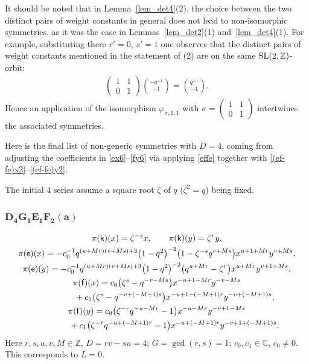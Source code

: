 \documentclass[10pt,a4paper]{amsart}
\numberwithin{equation}{section}
\begin{document}
\begin{Remark}It should be noted that in Lemma~\ref{lem_det4}(2), the choice between the two distinct pairs of weight constants in general does not lead to non-isomorphic symmetries, as it was the case in Lemmas~\ref{lem_det2}(1) and~\ref{lem_det4}(1). For example, substituting there $r'=0$, $s'=1$ one observes that the distinct pairs of weight constants mentioned in the statement of (2) are on the same ${\rm SL}(2,\mathbb{Z})$-orbit:
\begin{gather*}
\begin{pmatrix}1 & 1\\ 0 & 1\end{pmatrix}\binom{-q^{-1}}{-1}=\binom{q^{-1}}{-1}.
\end{gather*}
Hence an application of the isomorphism $\varphi_{\sigma,1,1}$ with $\sigma= \left(\begin{smallmatrix}1 & 1\\ 0 & 1\end{smallmatrix}\right)$ intertwines the associated symmetries.
\end{Remark}

Here is the final list of non-generic symmetries with $D=4$, coming from adjusting the coefficients in \eqref{ex6}--\eqref{fy6} via applying \eqref{effe} together with \eqref{(ef-fe)x2}--\eqref{(ef-fe)y2}.

The initial $4$ series assume a square root $\zeta$ of $q$ ($\zeta^2=q$) being fixed.

\subsubsection*{$\boldsymbol{D_4G_1E_1F_2(a)}$}
\begin{gather*}
\pi(\mathsf{k})(x)= \zeta^{-s}x ,\qquad\pi(\mathsf{k})(y)=\zeta^ry ,\\
\pi(\mathsf{e})(x)= -c_0^{-1}q^{(u+Mr)(v+Ms)+3}\big(1-q^2\big)^{-2}\big(1-\zeta^{-s}q^{v+Ms}\big)x^{u+1+Mr}y^{v+Ms} ,\\
\pi(\mathsf{e})(y)= -c_0^{-1}q^{(u+Mr)(v+Ms)+3}\big(1-q^2\big)^{-2}\big(q^{u+Mr}-\zeta^r\big)x^{u+Mr}y^{v+1+Ms} ,\\
\pi(\mathsf{f})(x)= c_0\big(\zeta^s-q^{-v-Ms}\big)x^{-u+1-Mr}y^{-v-Ms}\\
\hphantom{\pi(\mathsf{f})(x)=}{} + c_1\big(\zeta^s-q^{-v+(-M+1)s}\big)x^{-u+1+(-M+1)r}y^{-v+(-M+1)s} ,\\
\pi(\mathsf{f})(y)= c_0\big(\zeta^{-r}q^{-u-Mr}-1\big)x^{-u-Mr}y^{-v+1-Ms}\\
\hphantom{\pi(\mathsf{f})(y)=}{} + c_1\big(\zeta^{-r}q^{-u+(-M+1)r}-1\big)x^{-u+(-M+1)r}y^{-v+1+(-M+1)s} .
\end{gather*}
Here $r,s,u,v,M\in\mathbb{Z}$, $D=rv-su=4$; $G=\operatorname{gcd}(r,s)=1$; $c_0,c_1\in\mathbb{C}$, $c_0\ne 0$. This corresponds to $L=0$.
\end{document}
